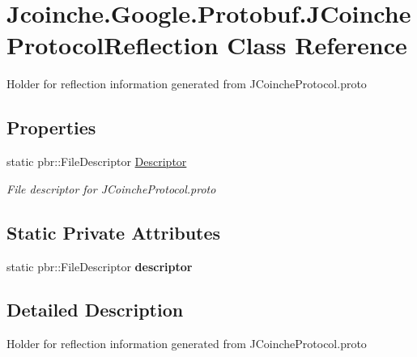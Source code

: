 \hypertarget{class_jcoinche_1_1_google_1_1_protobuf_1_1_j_coinche_protocol_reflection}{}\section{Jcoinche.\+Google.\+Protobuf.\+J\+Coinche\+Protocol\+Reflection Class Reference}
\label{class_jcoinche_1_1_google_1_1_protobuf_1_1_j_coinche_protocol_reflection}


Holder for reflection information generated from J\+Coinche\+Protocol.\+proto 


\subsection*{Properties}
\begin{DoxyCompactItemize}
\item 
static pbr\+::\+File\+Descriptor \hyperlink{class_jcoinche_1_1_google_1_1_protobuf_1_1_j_coinche_protocol_reflection_ae7faabc01c152cac6b55c1e151d206af}{Descriptor}
\begin{DoxyCompactList}\small\item\em File descriptor for J\+Coinche\+Protocol.\+proto\end{DoxyCompactList}\end{DoxyCompactItemize}
\subsection*{Static Private Attributes}
\begin{DoxyCompactItemize}
\item 
\mbox{\label{class_jcoinche_1_1_google_1_1_protobuf_1_1_j_coinche_protocol_reflection_a15b5978c3077cb8b3d735129886fd253}} 
static pbr\+::\+File\+Descriptor {\bfseries descriptor}
\end{DoxyCompactItemize}


\subsection{Detailed Description}
Holder for reflection information generated from J\+Coinche\+Protocol.\+proto




